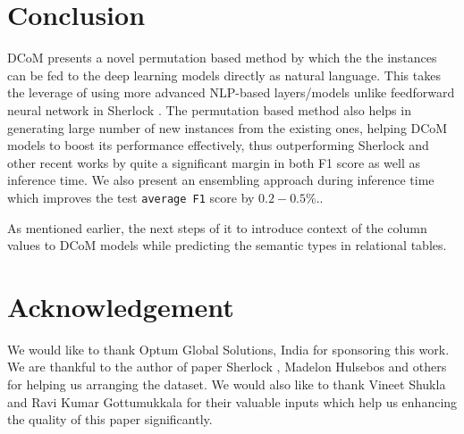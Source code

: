 \documentclass{article}
\begin{document}
\section{Conclusion}
\label{sec:conclusion}
DCoM presents a novel permutation based method by which the the instances can be fed to the deep learning models directly as natural language. This takes the leverage of using more advanced NLP-based layers/models unlike feedforward neural network in Sherlock \cite{Hulsebos}. The permutation based method also helps in generating large number of new instances from the existing ones, helping DCoM models to boost its performance effectively, thus outperforming Sherlock \cite{Hulsebos} and other recent works by quite a significant margin in both F1 score as well as inference time. We also present an ensembling approach during inference time which improves the test \texttt{average F1} score by $0.2 - 0.5\%$..  

As mentioned earlier, the next steps of it to introduce context of the column values to DCoM models while predicting the semantic types in relational tables.

\section*{Acknowledgement}
We would like to thank Optum Global Solutions, India for sponsoring this work. We are thankful to the author of paper Sherlock \cite{Hulsebos}, Madelon Hulsebos and others for helping us arranging the dataset. We would also like to thank
Vineet Shukla and Ravi Kumar Gottumukkala for their valuable inputs which help us enhancing the quality of this paper significantly.


\printbibliography
\end{document}
